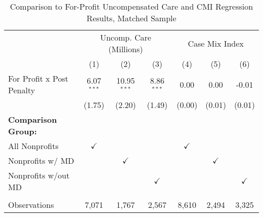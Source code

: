 \begin{table}[htbp]
   \caption{\label{tab:forprofit_uncomp_CMI_matchsample} Comparison to For-Profit Uncompensated Care and CMI Regression Results, Matched Sample}
   \bigskip
   \centering
   \begin{tabular}{lcccccc}
      \toprule
       & \multicolumn{3}{c}{Uncomp. Care (Millions)} & \multicolumn{3}{c}{Case Mix Index}\\
                                  & (1)           & (2)           & (3)           & (4)           & (5)           & (6)\\  
      \midrule 
      For Profit x Post Penalty   & 6.07$^{***}$  & 10.95$^{***}$ & 8.86$^{***}$  & 0.00          & 0.00          & -0.01\\   
                                  & (1.75)        & (2.20)        & (1.49)        & (0.00)        & (0.01)        & (0.01)\\   
      \textbf{Comparison Group:}  &               &               &               &               &               & \\  
      All Nonprofits              & $\checkmark$  &               &               & $\checkmark$  &               & \\  
      Nonprofits w/ MD            &               & $\checkmark$  &               &               & $\checkmark$  & \\  
      Nonprofits w/out MD         &               &               & $\checkmark$  &               &               & $\checkmark$\\   
       \\
      Observations                & 7,071         & 1,767         & 2,567         & 8,610         & 2,494         & 3,325\\  
      \bottomrule
   \end{tabular}
\end{table}
